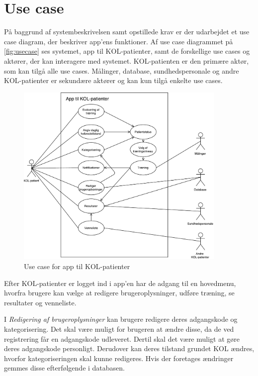 \section{Use case} \label{sec:usecase} 
På baggrund af systembeskrivelsen samt opstillede krav er der udarbejdet et use case diagram, der beskriver app'ens funktioner. Af use case diagrammet på \autoref{fig:usecase} ses systemet, app til KOL-patienter, samt de forskellige use cases og aktører, der kan interagere med systemet. KOL-patienten er den primære aktør, som kan tilgå alle use cases. Målinger, database, sundhedspersonale og andre KOL-patienter er sekundære aktører og kan kun tilgå enkelte use cases. 

\begin{figure} [H]
\centering
\includegraphics[width=0.9\textwidth]{figures/aktivitetsdiagram/Usecase}
\caption{Use case for app til KOL-patienter}
\label{fig:usecase}
\end{figure}

\noindent
Efter KOL-patienter er logget ind i app'en har de adgang til en hovedmenu, hvorfra brugere kan vælge at redigere brugeroplysninger, udføre træning, se resultater og venneliste. 

I \textit{Redigering af brugeroplysninger} kan brugere redigere deres adgangskode og kategorisering. Det skal være muligt for brugeren at ændre disse, da de ved registrering får en adgangskode udleveret. Dertil skal det være muligt at gøre deres adgangskode personligt. Derudover kan deres tilstand grundet KOL ændres, hvorfor kategoriseringen skal kunne redigeres. Hvis der foretages ændringer gemmes disse efterfølgende i databasen. 


